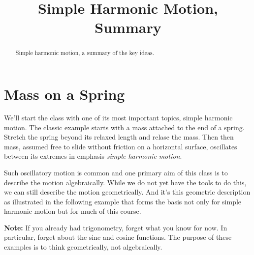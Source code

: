 \documentclass{ximera}
\title{Simple Harmonic Motion, Summary}
\begin{document}
\begin{abstract}
Simple harmonic motion, a summary of the key ideas.
\end{abstract}
\maketitle

\section{Mass on a Spring}

We'll start the class with one of its most important topics, simple harmonic motion. The classic example starts with a mass attached to the end of a spring. Stretch the spring beyond its relaxed length and relase the mass. Then then mass, assumed free to slide without friction on a horizontal surface, oscillates between its extremes in emphasis \emph{simple harmonic motion}.

Such oscillatory motion is common and one primary aim of this class is to describe the motion algebraically. While we do not yet have the tools to do this, we can still describe the motion geometrically. And it's this geometric description as illustrated in the following example that forms the basis not only for simple harmonic motion but for much of this course.

{\bf Note:} If you already had trigonometry, forget what you know for now. In particular, forget about the sine and cosine functions. The purpose of these examples is to think geometrically, not algebraically.
\end{document}

